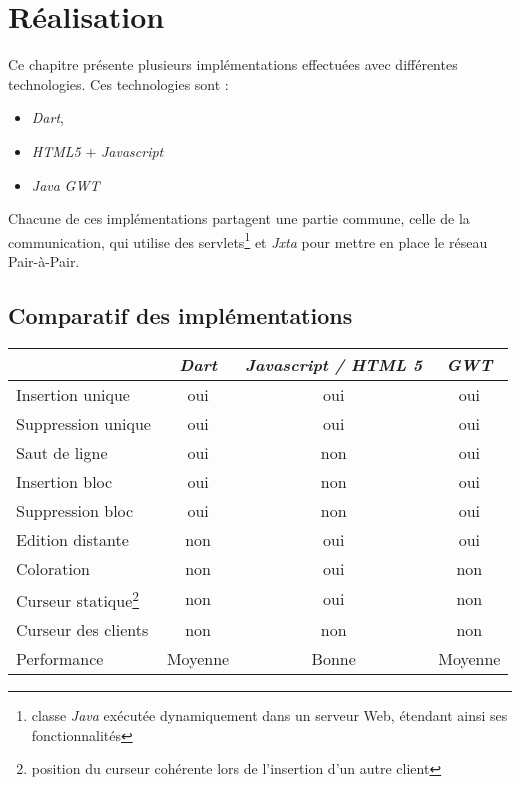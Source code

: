\chapter{Réalisation}
  Ce chapitre présente plusieurs implémentations effectuées avec différentes
  technologies. Ces technologies sont :
  \begin{itemize}
    \item \emph{Dart},
    \item \emph{HTML5} $+$ \emph{Javascript}
    \item \emph{Java} \emph{GWT}
  \end{itemize}
  Chacune de ces implémentations partagent une partie commune, celle de la
  communication, qui utilise des servlets\footnote{classe \emph{Java} exécutée
  dynamiquement dans un serveur Web, étendant ainsi ses fonctionnalités} et
  \emph{Jxta} pour mettre en place le réseau Pair-à-Pair.

  

  

  

  
  
  \section{Comparatif des implémentations}
  \begin{table}[h!]
    \center
    \begin{tabular}{|l|c|c|c|} 
    \hline
     ~ & \emph{Dart} & \emph{Javascript / HTML 5} & \emph{GWT}\\
    \hline
    Insertion unique & oui & oui &oui\\
    \hline
    Suppression unique & oui & oui & oui\\
    \hline
    Saut de ligne & oui & non & oui\\
    \hline
    Insertion bloc & oui & non & oui\\
    \hline
    Suppression bloc & oui & non & oui\\
    \hline
    Edition distante & non & oui & oui \\
    \hline
    Coloration & non & oui & non \\
    \hline
    Curseur statique\footnote{position du curseur cohérente lors de l'insertion d'un autre client} & non & oui & non \\ 
    \hline
    Curseur des clients & non & non & non \\
    \hline
    Performance & Moyenne & Bonne & Moyenne \\ 
    \hline
    \end{tabular}
  \end{table}
